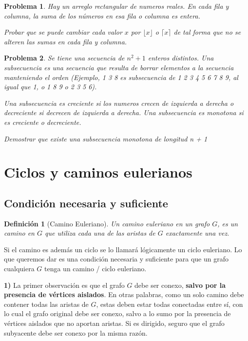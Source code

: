 \documentclass{article}
\newtheorem{definicion}{{\sc Definición}}
\newtheorem{problema}{{\sc Problema}}
\begin{document}
\begin{problema} 
Hay un arreglo rectangular de numeros reales. En cada fila y columna, la suma de los números en esa fila o columna es entera.

Probar que se puede cambiar cada valor $x$ por $\lfloor x \rfloor $ o $\lceil x \rceil$ de tal forma que no se alteren las sumas en cada fila y columna.
\end{problema}


\begin{problema}
Se tiene una secuencia de $n^2 + 1$ enteros distintos. Una subsecuencia es una secuencia que resulta de borrar elementos a la secuencia
manteniendo el orden (Ejemplo, 1 3 8 es subsecuencia de 1 2 3 4 5 6 7 8 9, al igual que 1,  o 1 8 9 o 2 3 5 6).

Una subsecuencia es creciente si los numeros crecen de izquierda a derecha o decreciente si decrecen de izquierda a derecha. Una
subsecuencia es monotona si es creciente o decreciente.

Demostrar que existe una subsecuencia monotona de longitud n + 1
\end{problema}

\pagebreak

\section{Ciclos y caminos eulerianos}

\subsection{Condición necesaria y suficiente}

\begin{definicion}[Camino Euleriano]
Un camino euleriano en un grafo $G$, es un camino en $G$ que utiliza cada una de las aristas de $G$ exactamente una vez.
\end{definicion}

Si el camino es además un ciclo se lo llamará lógicamente un ciclo euleriano. Lo que queremos dar es una condición necesaria y suficiente para que un grafo cualquiera $G$ tenga un camino / ciclo euleriano.

\textbf{1)} La primer observación es que el grafo $G$ debe ser conexo, \textbf{salvo por la presencia de vértices aislados}. En otras palabras, como un solo camino debe contener todas las aristas de $G$, estas deben estar todas conectadas entre sí, con lo cual el grafo original debe ser conexo, salvo a lo sumo por la presencia de vértices aislados que no aportan aristas. Si es dirigido, seguro que el grafo subyacente debe ser conexo por la misma razón.
\end{document}
